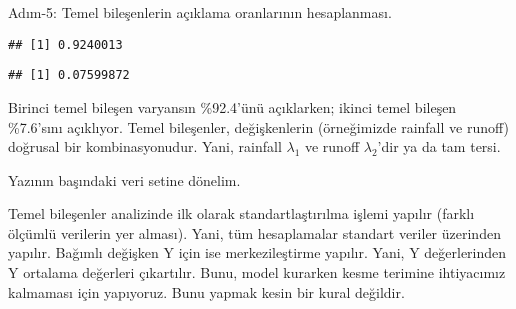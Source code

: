 \documentclass[
]{book}
\newenvironment{Shaded}{\begin{snugshade}}{\end{snugshade}}
\newcommand{\CommentTok}[1]{\textcolor[rgb]{0.56,0.35,0.01}{\textit{#1}}}
\newcommand{\ControlFlowTok}[1]{\textcolor[rgb]{0.13,0.29,0.53}{\textbf{#1}}}
\newcommand{\DataTypeTok}[1]{\textcolor[rgb]{0.13,0.29,0.53}{#1}}
\newcommand{\DecValTok}[1]{\textcolor[rgb]{0.00,0.00,0.81}{#1}}
\newcommand{\KeywordTok}[1]{\textcolor[rgb]{0.13,0.29,0.53}{\textbf{#1}}}
\newcommand{\NormalTok}[1]{#1}
\newcommand{\OperatorTok}[1]{\textcolor[rgb]{0.81,0.36,0.00}{\textbf{#1}}}
\newcommand{\StringTok}[1]{\textcolor[rgb]{0.31,0.60,0.02}{#1}}
\begin{document}
Adım-5: Temel bileşenlerin açıklama oranlarının hesaplanması.

\begin{Shaded}
\end{Shaded}

\begin{verbatim}
## [1] 0.9240013
\end{verbatim}

\begin{Shaded}
\end{Shaded}

\begin{verbatim}
## [1] 0.07599872
\end{verbatim}

Birinci temel bileşen varyansın \%92.4'ünü açıklarken; ikinci temel bileşen \%7.6'sını açıklıyor. Temel bileşenler, değişkenlerin (örneğimizde rainfall ve runoff) doğrusal bir kombinasyonudur. Yani, rainfall \(λ_1\) ve runoff \(λ_2\)'dir ya da tam tersi.

Yazının başındaki veri setine dönelim.

Temel bileşenler analizinde ilk olarak standartlaştırılma işlemi yapılır (farklı ölçümlü verilerin yer alması). Yani, tüm hesaplamalar standart veriler üzerinden yapılır. Bağımlı değişken Y için ise merkezileştirme yapılır. Yani, Y değerlerinden Y ortalama değerleri çıkartılır. Bunu, model kurarken kesme terimine ihtiyacımız kalmaması için yapıyoruz. Bunu yapmak kesin bir kural değildir.

\begin{Shaded}
\end{Shaded}
\end{document}
